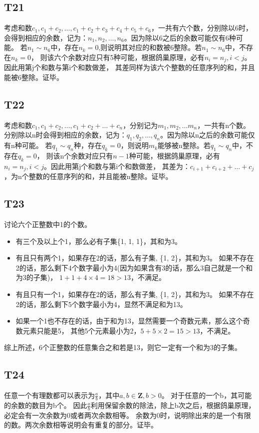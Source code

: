 \documentclass{article}
\begin{document}
\subsection{T21}
考虑和数$c_1, c_1 + c_2, \dots, c_1 + c_2 + c_3 + c_4 + c_5 + c_6$，一共有六个数，分别除以6时，
会得到相应的余数，记为：$n_1, n_2, \dots ,n_6$。因为除以6之后的余数可能仅有6种可能。
若$n_1 \sim n_6$中，存在$n_k = 0$,则说明其对应的和数被6整除。若$n_1 \sim n_6$中，不存在$n_k = 0$，
则该六个余数对应只有5种可能，根据鸽巢原理，必有$n_i = n_j, i < j$。因此用第j个和数与第i个和数做差，
其差同样为该六个整数的任意序列的和，并且能被6整除。证毕。
\subsection{T22}
考虑和数$c_1, c_1 + c_2, \dots, c_1 + c_2 + \dots + c_n$，分别记为$m_1, m_2, \dots m_n$，一共有n个数。
分别除以n时会得到相应的余数，记为：$q_1, q_2, \dots, q_n$。因为除以n之后的余数可能仅有n种可能。
若$q_1 \sim q_n$种，存在$q_k = 0$，则说明$m_k$能够被n整除。若$q_1 \sim q_n$中，不存在$q_k = 0$，
则该n个余数对应只有$n - 1$种可能，根据鸽巢原理，必有$n_i = n_j, i < j$。因此用第j个和数与第i个和数做差，
其差为：$c_{i + 1} + c_{i + 2} + \dots + c_j$，为n个整数的任意序列的和，并且能被n整除。证毕。
\subsection{T23}
讨论六个正整数中1的个数。
\begin{itemize}
    \item 有三个及以上个1，那么必有子集\{1, 1, 1\}，其和为3。
    \item 有且只有两个1，如果存在2的话，那么有子集, \{1, 2\}，其和为3。
如果不存在2的话，那么剩下4个数字最小为4(因为如果含有3的话，那么3自己就是一个和为3的子集)，
$1 + 1 + 4 \times 4 = 18 > 13$，不满足。
    \item 有且只有一个1，如果存在2的话，那么有子集, \{1, 2\}，其和为3。
如果不存在2的话，那么剩下5个数字最小为4，显然不满足和为13。
    \item 如果一个1也不存在的话，由于和为13，显然需要一个奇数元素，那么这个奇数元素只能是5，
其他5个元素最小为2，$5 + 5 \times 2 = 15 > 13$，不满足。
\end{itemize}
综上所述，6个正整数的任意集合之和若是13，则它一定有一个和为3的子集。
\subsection{T24}
任意一个有理数都可以表示为$\frac{a}{b}$，其中$a, b\in \mathbf{Z}, b > 0$。
对于任意的一个b，其可能的余数的数目为b个。
因此$\frac{a}{b}$利用保留余数的除法，除上b次之后，根据鸽巢原理，必定会有一次余数为0或者两次余数相等。
余数为0时，说明除出来的是一个有限的数。两次余数相等说明会有重复的部分。证毕。
\end{document}
